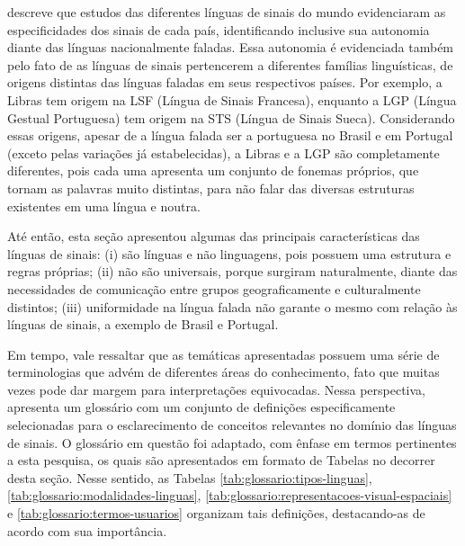  descreve que estudos das diferentes línguas de sinais do mundo evidenciaram as especificidades dos sinais de cada país, identificando inclusive sua autonomia diante das línguas nacionalmente faladas. Essa autonomia é evidenciada também pelo fato de as línguas de sinais pertencerem a diferentes famílias linguísticas, de origens distintas das línguas faladas em seus respectivos países. Por exemplo, a Libras tem origem na LSF (Língua de Sinais Francesa), enquanto a LGP (Língua Gestual Portuguesa) tem origem na STS (Língua de Sinais Sueca). Considerando essas origens, apesar de a língua falada ser a portuguesa no Brasil e em Portugal (exceto pelas variações já estabelecidas), a Libras e a LGP são completamente diferentes, pois cada uma apresenta um conjunto de fonemas próprios, que tornam as palavras muito distintas, para não falar das diversas estruturas existentes em uma língua e noutra.

Até então, esta seção apresentou algumas das principais características das línguas de sinais: (i) são línguas e não linguagens, pois possuem uma estrutura e regras próprias; (ii) não são universais, porque surgiram naturalmente, diante das necessidades de comunicação entre grupos geograficamente e culturalmente distintos; (iii) uniformidade na língua falada não garante o mesmo com relação às línguas de sinais, a exemplo de Brasil e Portugal.

Em tempo, vale ressaltar que as temáticas apresentadas possuem uma série de terminologias que advém de diferentes áreas do conhecimento, fato que muitas vezes pode dar margem para interpretações equivocadas. Nessa perspectiva,  apresenta um glossário com um conjunto de definições especificamente selecionadas para o esclarecimento de conceitos relevantes no domínio das línguas de sinais. O glossário em questão foi adaptado, com ênfase em termos pertinentes a esta pesquisa, os quais são apresentados em formato de Tabelas no decorrer desta seção. Nesse sentido, as Tabelas \ref{tab:glossario:tipos-linguas}, \ref{tab:glossario:modalidades-linguas}, \ref{tab:glossario:representacoes-visual-espaciais} e \ref{tab:glossario:termos-usuarios} organizam tais definições, destacando-as de acordo com sua importância.

